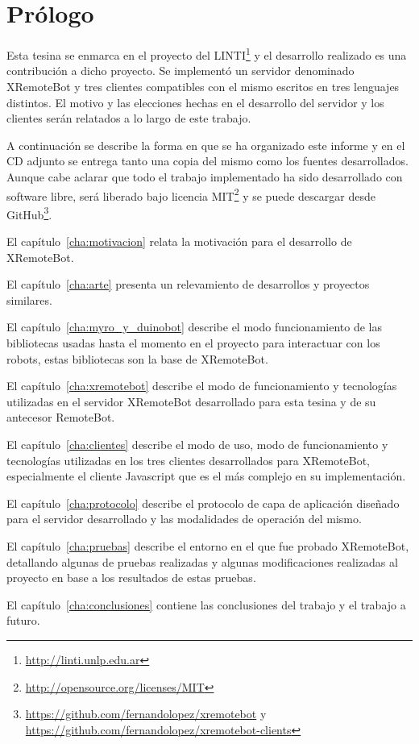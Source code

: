 \chapter*{Prólogo}\label{cha:prologo}


Esta tesina se enmarca en el proyecto \proyecto{} del
LINTI\footnote{\url{http://linti.unlp.edu.ar}}
y el desarrollo realizado
es una contribución a dicho proyecto.
Se implementó un servidor denominado XRemoteBot y tres
clientes compatibles
con el mismo escritos en tres lenguajes distintos. El motivo y las elecciones hechas
en el desarrollo del servidor y los clientes serán relatados a lo largo de este
trabajo.

A continuación se describe la forma en que se ha organizado este informe y en el CD
adjunto se entrega tanto una copia del mismo como los fuentes desarrollados.
Aunque
cabe aclarar que todo el trabajo implementado ha sido desarrollado con software libre,
será liberado bajo licencia
MIT\footnote{\url{http://opensource.org/licenses/MIT}} y se puede descargar
desde GitHub\footnote{%
\url{https://github.com/fernandolopez/xremotebot} y
\url{https://github.com/fernandolopez/xremotebot-clients}}.

El capítulo~\ref{cha:motivacion} relata la motivación para el desarrollo de
XRemoteBot.

El capítulo~\ref{cha:arte} presenta un relevamiento de desarrollos y
proyectos similares.

El capítulo~\ref{cha:myro_y_duinobot} describe el modo funcionamiento de las
bibliotecas usadas hasta el momento en el proyecto \proyecto{} para
interactuar con los robots, estas
bibliotecas son la base de XRemoteBot.

El capítulo~\ref{cha:xremotebot} describe el modo de funcionamiento y
tecnologías utilizadas en el servidor
XRemoteBot desarrollado para esta tesina y de su antecesor RemoteBot.

El capítulo~\ref{cha:clientes} describe el modo de uso, modo de
funcionamiento y
tecnologías utilizadas en los tres clientes desarrollados para
XRemoteBot, especialmente el cliente Javascript que es el más complejo
en su implementación.

El capítulo~\ref{cha:protocolo} describe el protocolo de capa de aplicación diseñado para
el servidor desarrollado y las modalidades de operación del mismo.

El capítulo~\ref{cha:pruebas} describe el entorno en el que fue probado
XRemoteBot, detallando algunas de pruebas realizadas y algunas
modificaciones
realizadas al proyecto en base a los resultados de estas pruebas.

El capítulo~\ref{cha:conclusiones} contiene las conclusiones del trabajo
y el trabajo a futuro.
